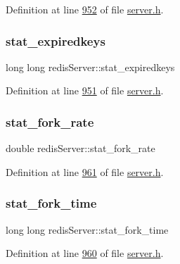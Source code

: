 Definition at line \hyperlink{server_8h_source_l00952}{952} of file \hyperlink{server_8h_source}{server.\+h}.

\mbox{\label{structredisServer_a2ae3e181c0d9f21c8695fd01f9b0fdfc}} 
\subsubsection{\texorpdfstring{stat\+\_\+expiredkeys}{stat\_expiredkeys}}
{\footnotesize\ttfamily long long redis\+Server\+::stat\+\_\+expiredkeys}



Definition at line \hyperlink{server_8h_source_l00951}{951} of file \hyperlink{server_8h_source}{server.\+h}.

\mbox{\label{structredisServer_a2cd62801aa521c5370f2692fc541e10e}} 
\subsubsection{\texorpdfstring{stat\+\_\+fork\+\_\+rate}{stat\_fork\_rate}}
{\footnotesize\ttfamily double redis\+Server\+::stat\+\_\+fork\+\_\+rate}



Definition at line \hyperlink{server_8h_source_l00961}{961} of file \hyperlink{server_8h_source}{server.\+h}.

\mbox{\label{structredisServer_a8a21917e31de4e694fc8bec48dc4057d}} 
\subsubsection{\texorpdfstring{stat\+\_\+fork\+\_\+time}{stat\_fork\_time}}
{\footnotesize\ttfamily long long redis\+Server\+::stat\+\_\+fork\+\_\+time}



Definition at line \hyperlink{server_8h_source_l00960}{960} of file \hyperlink{server_8h_source}{server.\+h}.


